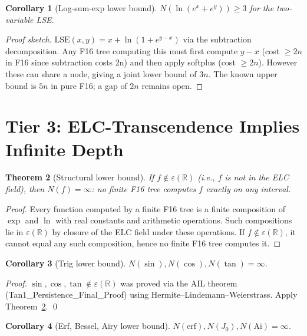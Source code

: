 \documentclass[11pt]{article}
\newtheorem{theorem}{Theorem}
\newtheorem{corollary}[theorem]{Corollary}
\begin{document}
\begin{corollary}[Log-sum-exp lower bound]
$N(\ln(e^x + e^y)) \geq 3$ for the two-variable LSE.
\end{corollary}

\begin{proof}[Proof sketch]
$\mathrm{LSE}(x,y) = x + \ln(1 + e^{y-x})$ via the subtraction decomposition.
Any F16 tree computing this must first compute $y - x$ (cost $\geq 2n$ in F16
since subtraction costs 2n) and then apply softplus (cost $\geq 2n$).
However these can share a node, giving a joint lower bound of $3n$.
The known upper bound is $5n$ in pure F16; a gap of $2n$ remains open.
\end{proof}

\section{Tier 3: ELC-Transcendence Implies Infinite Depth}

\begin{theorem}[Structural lower bound]
\label{thm:infinite}
If $f \notin \varepsilon(\mathbb{R})$ (i.e., $f$ is not in the ELC field),
then $N(f) = \infty$: no finite F16 tree computes $f$ exactly on any interval.
\end{theorem}

\begin{proof}
Every function computed by a finite F16 tree is a finite composition of $\exp$
and $\ln$ with real constants and arithmetic operations. Such compositions lie
in $\varepsilon(\mathbb{R})$ by closure of the ELC field under these operations.
If $f \notin \varepsilon(\mathbb{R})$, it cannot equal any such composition,
hence no finite F16 tree computes it.
\end{proof}

\begin{corollary}[Trig lower bound]
$N(\sin), N(\cos), N(\tan) = \infty$.
\end{corollary}

\begin{proof}
$\sin, \cos, \tan \notin \varepsilon(\mathbb{R})$ was proved via the AIL theorem
(Tan1\_Persistence\_Final\_Proof) using Hermite--Lindemann--Weierstrass.
Apply Theorem~\ref{thm:infinite}. \qed
\end{proof}

\begin{corollary}[Erf, Bessel, Airy lower bound]
$N(\mathrm{erf}), N(J_0), N(\mathrm{Ai}) = \infty$.
\end{corollary}
\end{document}
